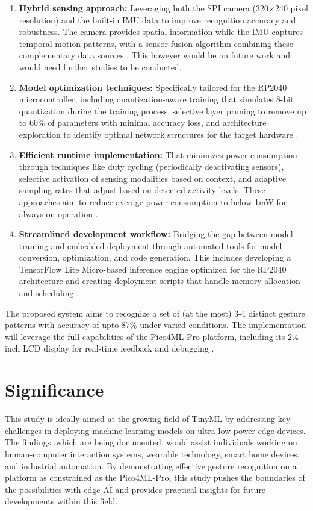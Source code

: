 \begin{enumerate}
	\item \textbf{Hybrid sensing approach:} Leveraging both the SPI camera (320×240 pixel resolution) and the built-in IMU data to improve recognition accuracy and robustness. The camera provides spatial information while the IMU captures temporal motion patterns, with a sensor fusion algorithm combining these complementary data sources \cite{Mathworks:2023}. This however would be an future work and would need further studies to be conducted.
	
	\item \textbf{Model optimization techniques:} Specifically tailored for the RP2040 microcontroller, including quantization-aware training that simulates 8-bit quantization during the training process, selective layer pruning to remove up to 60\% of parameters with minimal accuracy loss, and architecture exploration to identify optimal network structures for the target hardware \cite{Banbury:2020}.
	
	\item \textbf{Efficient runtime implementation:} That minimizes power consumption through techniques like duty cycling (periodically deactivating sensors), selective activation of sensing modalities based on context, and adaptive sampling rates that adjust based on detected activity levels. These approaches aim to reduce average power consumption to below 1mW for always-on operation \cite{EENews:2023}.
	
	\item \textbf{Streamlined development workflow:} Bridging the gap between model training and embedded deployment through automated tools for model conversion, optimization, and code generation. This includes developing a TensorFlow Lite Micro-based inference engine optimized for the RP2040 architecture and creating deployment scripts that handle memory allocation and scheduling \cite{Sadiq:2022}.\\
\end{enumerate}

The proposed system aims to recognize a set of (at the most) 3-4 distinct gesture patterns with accuracy of upto 87\% under varied conditions. The implementation will leverage the full capabilities of the Pico4ML-Pro platform, including its 2.4-inch LCD display for real-time feedback and debugging \cite{Arducam:2023}.\\

\section{Significance}
This study is ideally aimed at the growing field of TinyML by addressing key challenges in deploying machine learning models on ultra-low-power edge devices. The findings ,which are being documented, would assist individuals working on human-computer interaction systems, wearable technology, smart home devices, and industrial automation. By demonstrating effective gesture recognition on a platform as constrained as the Pico4ML-Pro, this study pushes the boundaries of the possibilities  with edge AI and provides practical insights for future developments within this field.

